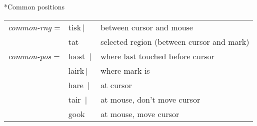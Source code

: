 \documentclass[twocolumn,10pt]{article}
\makeatletter
\renewcommand{\subsection}{\@startsection
  {subsection}{2}{0mm}{-.1\baselineskip}{-.1\baselineskip}%
  {\normalfont\bfseries}}
\newcommand{\vbar}{$\,|\,$}
\newcommand{\command}[1]{\textsf{\textup{#1}}}
\newcommand{\cat}[1]{\textrm{\textit{#1}}}
\newenvironment{mycenter}
{\begin{trivlist}\item \begin{footnotesize}}
{\end{footnotesize}\end{trivlist}}
\makeatother
\begin{document}
\subsection*{Common positions}
\begin{mycenter}
\begin{tabular}{lll}
\cat{common-rng} =& \command{tisk}\vbar & between cursor and mouse\\ 
& \command{tat} & selected region (between cursor and mark)\\
\cat{common-pos}  =& \command{loost} \vbar & where last touched before cursor\\
& \command{lairk}\vbar  & where mark is\\
& \command{hare} \vbar & at cursor \\
& \command{tair} \vbar & at mouse, don't move cursor\\
& \command{gook} & at mouse, move cursor\\
\end{tabular}
\end{mycenter}
\end{document}
